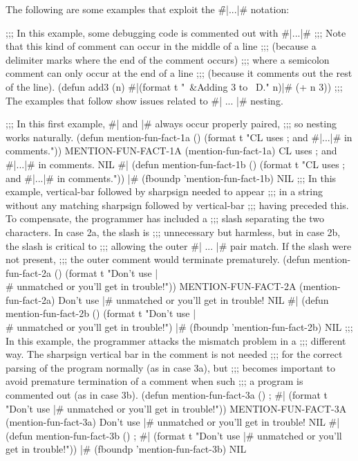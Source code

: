 The following are some examples that exploit the \f{\#|...|\#} notation:

\code
;;; In this example, some debugging code is commented out with #|...|#
;;; Note that this kind of comment can occur in the middle of a line
;;; (because a delimiter marks where the end of the comment occurs)
;;; where a semicolon comment can only occur at the end of a line 
;;; (because it comments out the rest of the line).
 (defun add3 (n) #|(format t "~&Adding 3 to ~D." n)|# (+ n 3))
\goodbreak
;;; The examples that follow show issues related to #| ... |# nesting.

;;; In this first example, #| and |# always occur properly paired,
;;; so nesting works naturally.
 (defun mention-fun-fact-1a ()
   (format t "CL uses ; and #|...|# in comments."))
\EV MENTION-FUN-FACT-1A
 (mention-fun-fact-1a)
\OUT CL uses ; and #|...|# in comments.
\EV NIL
 #| (defun mention-fun-fact-1b ()
      (format t "CL uses ; and #|...|# in comments.")) |#
 (fboundp 'mention-fun-fact-1b) \EV NIL
\goodbreak
;;; In this example, vertical-bar followed by sharpsign needed to appear
;;; in a string without any matching sharpsign followed by vertical-bar
;;; having preceded this.  To compensate, the programmer has included a
;;; slash separating the two characters.  In case 2a, the slash is 
;;; unnecessary but harmless, but in case 2b, the slash is critical to
;;; allowing the outer #| ... |# pair match.  If the slash were not present,
;;; the outer comment would terminate prematurely.
 (defun mention-fun-fact-2a ()
   (format t "Don't use |\\# unmatched or you'll get in trouble!"))
\EV MENTION-FUN-FACT-2A
 (mention-fun-fact-2a)
\OUT Don't use |# unmatched or you'll get in trouble!
\EV NIL
 #| (defun mention-fun-fact-2b ()
      (format t "Don't use |\\# unmatched or you'll get in trouble!") |#
 (fboundp 'mention-fun-fact-2b) \EV NIL
\goodbreak
;;; In this example, the programmer attacks the mismatch problem in a
;;; different way.  The sharpsign vertical bar in the comment is not needed
;;; for the correct parsing of the program normally (as in case 3a), but 
;;; becomes important to avoid premature termination of a comment when such 
;;; a program is commented out (as in case 3b).
 (defun mention-fun-fact-3a () ; #|
   (format t "Don't use |# unmatched or you'll get in trouble!"))
\EV MENTION-FUN-FACT-3A
 (mention-fun-fact-3a)
\OUT Don't use |# unmatched or you'll get in trouble!
\EV NIL
 #|
 (defun mention-fun-fact-3b () ; #|
   (format t "Don't use |# unmatched or you'll get in trouble!"))
 |#
 (fboundp 'mention-fun-fact-3b) \EV NIL
\endcode

